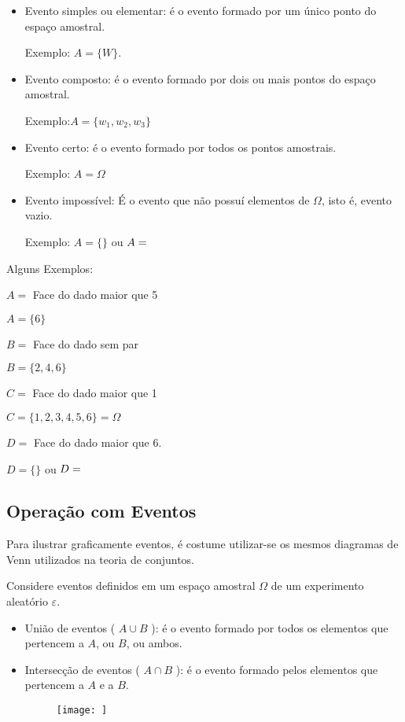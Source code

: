 \documentclass[11pt,a4paper]{book}
\begin{document}
\begin{itemize}
  \item Evento simples ou elementar: é o evento formado por um único ponto do espaço amostral. 

    Exemplo: $A=\{W\}$.

  \item Evento composto:  é o evento formado por dois ou mais pontos do espaço amostral.

    Exemplo:$ A= \{w_1,w_2,w_3 \}$

  \item Evento certo: é o evento formado por todos os pontos amostrais.

    Exemplo: $A= \Omega$ 

  \item Evento impossível: É o evento que não possuí elementos de $\Omega$, isto é, evento vazio.

    Exemplo: $A=\{\}$ ou $A= \empty$

\end{itemize}
Alguns Exemplos:

$A=$ Face do dado maior que 5

$A=\{6\}$

$B=$ Face do dado sem par 

$B= \{2,4,6\}$

$C=$ Face do dado maior que 1

$C= \{1,2,3,4,5,6\}=\Omega$

$D=$ Face do dado maior que 6.

$D=\{ \}$ ou $D=\null$
\subsection{Operação com Eventos}
Para ilustrar graficamente eventos, é costume utilizar-se os mesmos diagramas de Venn utilizados na teoria de conjuntos.

Considere eventos definidos em um espaço amostral $\Omega$ de um experimento aleatório $\varepsilon$.
\begin{itemize}
  \item União de eventos ( $A \cup B$ ): é o evento formado por todos os elementos que pertencem a $A$, ou  $B$, ou ambos.
    \begin{figure}
    \end{figure}

  \item Intersecção de eventos ( $A \cap B$ ): é o evento formado pelos elementos que pertencem a $A$ e a $B$.
   \begin{figure}[]
     \centering
     \texttt{[image: ]}
       \caption{}
       \label{figura:2}
     \end{figure} 

\end{itemize}
\end{document}
